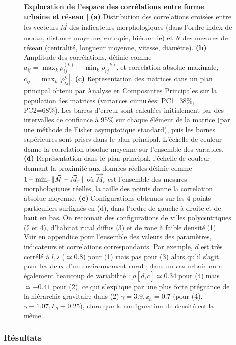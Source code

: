 \begin{figure}
\caption{\small\textbf{Exploration de l'espace des corrélations entre forme urbaine et réseau | } \textbf{(a)} Distribution des correlations croisées entre les vecteurs $\vec{M}$ des indicateurs morphologiques (dans l'ordre index de moran, distance moyenne, entropie, hiérarchie) et $\vec{N}$ des mesures de réseau (centralité, longueur moyenne, vitesse, diamètre). \textbf{(b)} Amplitude des corrélations, définie comme $a_{ij}=\max_k{\rho_{ij}^{(k)}}-\min_k{\rho_{ij}^{(k)}}$, et correlation absolue maximale, $c_{ij}=\max_k\left| \rho_{ij}^{k} \right|$. \textbf{(c)} Représentation des matrices dans un plan principal obtenu par Analyse en Composantes Principales sur la population des matrices (variances cumulées: PC1=38\%, PC2=68\%). Les barres d'erreur sont calculées initialement par des intervalles de confiance à 95\% sur chaque élément de la matrice (par une méthode de Fisher asymptotique standard), puis les bornes supérieures sont prises dans le plan principal. L'échelle de couleur donne la correlation absolue moyenne sur l'ensemble des variables. \textbf{(d)} Représentation dans le plan principal, l'échelle de couleur donnant la proximité aux données réelles définie comme $1 - \min_r \| \vec{M}-\vec{M}_r \|$ où $\vec{M}_r$ est l'ensemble des mesures morphologiques réelles, la taille des points donne la correlation absolue moyenne. \textbf{(e)} Configurations obtenues sur les 4 points particuliers surlignés en (d), dans l'ordre de gauche à droite et de haut en bas. On reconnait des configurations de villes polycentriques (2 et 4), d'habitat rural diffus (3) et de zone à faible densité (1). Voir en appendice pour l'ensemble des valeurs des paramètres, indicateurs et correlations correspondants. Par exemple, $\bar{d}$ est très corrélé à $\bar{l},\bar{s}$ ($\simeq$0.8) pour (1) mais pas pour (3) alors qu'il s'agit pour les deux d'un environnement rural ; dans un cas urbain on a également beaucoup de variabilité : $\rho[\bar{d},\bar{c}]\simeq 0.34$ pour (4) mais $\simeq-0.41$ pour (2), ce qui s'explique par une plus forte prégnance de la hiérarchie gravitaire dans (2) $\gamma=3.9,k_h=0.7$ (pour (4), $\gamma=1.07,k_h=0.25$), alors que la configuration de densité est la même.}
\label{fig:densnwcor}
\end{figure}






\subsubsection{Résultats}

